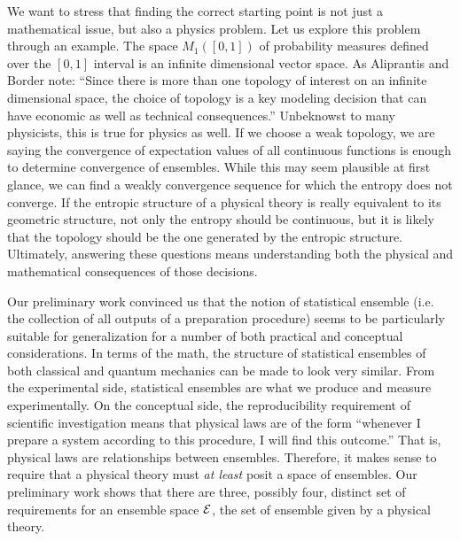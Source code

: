 We want to stress that finding the correct starting point is not just a mathematical issue, but also a physics problem. Let us explore this problem through an example. The space $M_1([0,1])$ of probability measures defined over the $[0,1]$ interval is an infinite dimensional vector space. As Aliprantis and Border note: ``Since there is more than one topology of interest on an infinite dimensional space, the choice of topology is a key modeling decision that can have economic as well as technical consequences.'' Unbeknowst to many physicists, this is true for physics as well. If we choose a weak topology, we are saying the convergence of expectation values of all continuous functions is enough to determine convergence of ensembles. While this may seem plausible at first glance, we can find a weakly convergence sequence for which the entropy does not converge. If the entropic structure of a physical theory is really equivalent to its geometric structure, not only the entropy should be continuous, but it is likely that the topology should be the one generated by the entropic structure. Ultimately, answering these questions means understanding both the physical and mathematical consequences of those decisions.

Our preliminary work convinced us that the notion of statistical ensemble (i.e. the collection of all outputs of a preparation procedure) seems to be particularly suitable for generalization for a number of both practical and conceptual considerations. In terms of the math, the structure of statistical ensembles of both classical and quantum mechanics can be made to look very similar. From the experimental side, statistical ensembles are what we produce and measure experimentally. On the conceptual side, the reproducibility requirement of scientific investigation means that physical laws are of the form ``whenever I prepare a system according to this procedure, I will find this outcome.'' That is, physical laws are relationships between ensembles. Therefore, it makes sense to require that a physical theory must \emph{at least} posit a space of ensembles. Our preliminary work shows that there are three, possibly four, distinct set of requirements for an ensemble space $\mathcal{E}$, the set of ensemble given by a physical theory.


